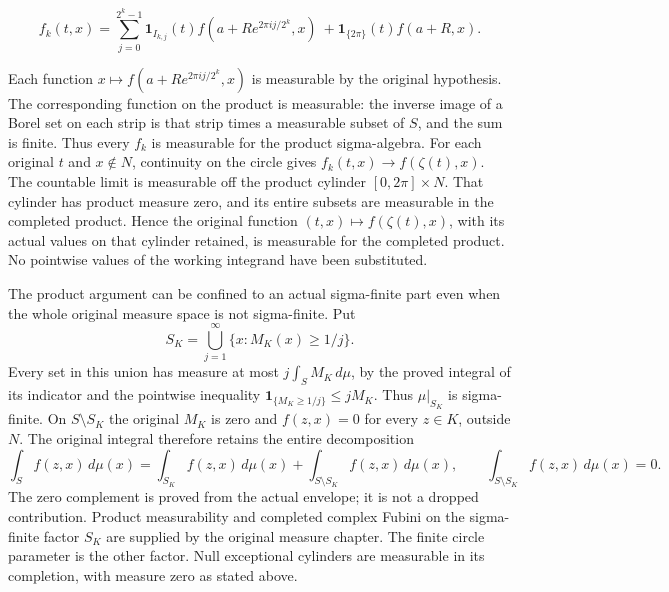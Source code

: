 \documentclass[
  11pt,
]{article}
\begin{document}
\[
f_k(t,x)=\sum_{j=0}^{2^k-1}
\boldsymbol1_{I_{k,j}}(t)
f\!\left(a+Re^{2\pi i j/2^k},x\right)
\ +\boldsymbol1_{\{2\pi\}}(t)f(a+R,x).
\tag{CMI1}
\]

Each function \(x\mapsto f(a+Re^{2\pi i j/2^k},x)\) is measurable by the
original hypothesis. The corresponding function on the product is
measurable: the inverse image of a Borel set on each strip is that strip
times a measurable subset of \(S\), and the sum is finite. Thus every
\(f_k\) is measurable for the product sigma-algebra. For each original
\(t\) and \(x\notin N\), continuity on the circle gives
\(f_k(t,x)\to f(\zeta(t),x)\). The countable limit is measurable off the
product cylinder \([0,2\pi]\times N\). That cylinder has product measure
zero, and its entire subsets are measurable in the completed product.
Hence the original function \((t,x)\mapsto f(\zeta(t),x)\), with its
actual values on that cylinder retained, is measurable for the completed
product. No pointwise values of the working integrand have been
substituted.

The product argument can be confined to an actual sigma-finite part even
when the whole original measure space is not sigma-finite. Put \[
S_K=\bigcup_{j=1}^\infty\{x:M_K(x)\geq1/j\}.
\tag{CMI2}
\] Every set in this union has measure at most \(j\int_S M_K\,d\mu\), by
the proved integral of its indicator and the pointwise inequality
\(\boldsymbol1_{\{M_K\geq1/j\}}\leq jM_K\). Thus \(\mu|_{S_K}\) is
sigma-finite. On \(S\setminus S_K\) the original \(M_K\) is zero and
\(f(z,x)=0\) for every \(z\in K\), outside \(N\). The original integral
therefore retains the entire decomposition \[
\int_S f(z,x)\,d\mu(x)
=\int_{S_K}f(z,x)\,d\mu(x)
 +\int_{S\setminus S_K}f(z,x)\,d\mu(x),
\qquad
\int_{S\setminus S_K}f(z,x)\,d\mu(x)=0 .
\tag{CMI3}
\] The zero complement is proved from the actual envelope; it is not a
dropped contribution. Product measurability and completed complex Fubini
on the sigma-finite factor \(S_K\) are supplied by the original measure
chapter. The finite circle parameter is the other factor. Null
exceptional cylinders are measurable in its completion, with measure
zero as stated above.
\end{document}
